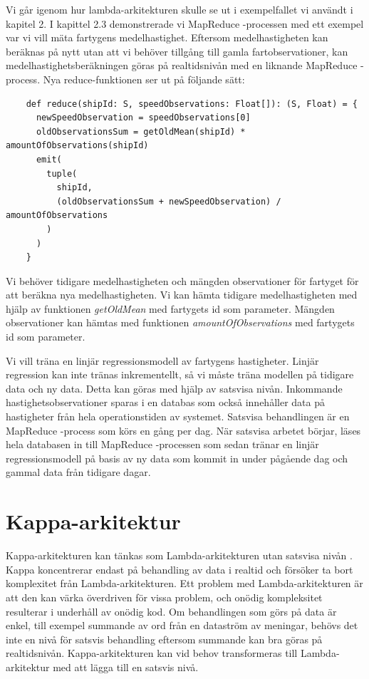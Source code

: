 Vi går igenom hur lambda-arkitekturen skulle se ut i exempelfallet vi
användt i kapitel 2. I kapittel 2.3 demonstrerade vi MapReduce -processen
med ett exempel var vi vill mäta fartygens medelhastighet. Eftersom medelhastigheten
kan beräknas på nytt utan att vi behöver tillgång till gamla fartobservationer, kan 
medelhastighetsberäkningen göras på realtidsnivån med en liknande MapReduce -process.
Nya reduce-funktionen ser ut på följande sätt:

\begin{verbatim}
    def reduce(shipId: S, speedObservations: Float[]): (S, Float) = {
      newSpeedObservation = speedObservations[0]
      oldObservationsSum = getOldMean(shipId) * amountOfObservations(shipId)
      emit(
        tuple(
          shipId,
          (oldObservationsSum + newSpeedObservation) / amountOfObservations
        )
      )
    }
\end{verbatim}

Vi behöver tidigare medelhastigheten och mängden observationer för fartyget för att
beräkna nya medelhastigheten. Vi kan hämta tidigare medelhastigheten med hjälp av
funktionen \textit{getOldMean} med fartygets id som parameter. Mängden observationer
kan hämtas med funktionen \textit{amountOfObservations} med fartygets id som parameter.

Vi vill träna en linjär regressionsmodell av fartygens hastigheter. Linjär regression
kan inte tränas inkrementellt, så vi måste träna modellen på tidigare data och ny data.
Detta kan göras med hjälp av satsvisa nivån. Inkommande hastighetsobservationer sparas i
en databas som också innehåller data på hastigheter från hela operationstiden av 
systemet. Satsvisa behandlingen är en MapReduce -process som körs en gång per dag. När
satsvisa arbetet börjar, läses hela databasen in till MapReduce -processen som sedan
tränar en linjär regressionsmodell på basis av ny data som kommit in under pågående dag
och gammal data från tidigare dagar.


\section{Kappa-arkitektur}

Kappa-arkitekturen kan tänkas som Lambda-arkitekturen utan satsvisa 
nivån \citep{kappa}. Kappa koncentrerar endast på behandling av data i realtid och
försöker ta bort komplexitet från Lambda-arkitekturen. Ett problem med 
Lambda-arkitekturen är att den kan värka överdriven för vissa problem, och onödig
kompleksitet resulterar i underhåll av onödig kod. Om behandlingen som görs
på data är enkel, till exempel summande av ord från en dataström av meningar,
behövs det inte en nivå för satsvis behandling eftersom summande kan bra göras
på realtidsnivån. Kappa-arkitekturen kan vid behov transformeras till 
Lambda-arkitektur med att lägga till en satsvis nivå.

